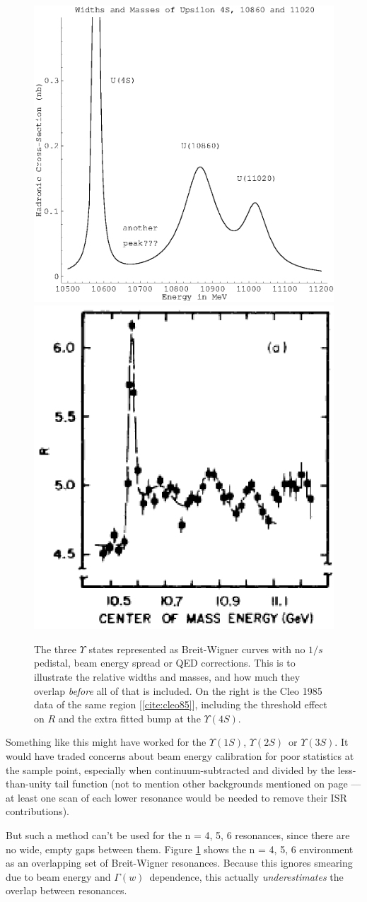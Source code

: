 \documentclass[12pt]{article}
\def\yis{$\Upsilon(1S)$}
\def\yiis{$\Upsilon(2S)$}
\def\yiiis{$\Upsilon(3S)$}
\def\yivs{$\Upsilon(4S)$}
\def\gamofw{$\Gamma(w)$}
\begin{document}
\begin{figure}[h]
  \begin{center}
    \includegraphics[width=0.35\linewidth]{theopeaks.eps}
    \includegraphics[width=0.35\linewidth]{exptpeaks.eps}
  \end{center}

  \caption{The three $\Upsilon$ states represented as Breit-Wigner
  curves with no $1/s$ pedistal, beam energy spread or QED
  corrections. This is to illustrate the relative widths and masses,
  and how much they overlap {\it before} all of that is included. On
  the right is the {\sc Cleo} 1985 data of the same region
  [\ref{cite:cleo85}], including the threshold effect on $R$ and the
  extra fitted bump at the \yivs.}

  \label{fig:theopeaks}
\end{figure}

Something like this might have worked for the \yis, \yiis\ or \yiiis.
It would have traded concerns about beam energy calibration for poor
statistics at the sample point, especially when continuum-subtracted
and divided by the less-than-unity tail function (not to mention other
backgrounds mentioned on page \pageref{page:other_backgrounds}--- at
least one scan of each lower resonance would be needed to remove their
ISR contributions).

But such a method can't be used for the n = 4, 5, 6 resonances, since
there are no wide, empty gaps between them. Figure \ref{fig:theopeaks}
shows the n = 4, 5, 6 environment as an overlapping set of
Breit-Wigner resonances. Because this ignores smearing due to beam
energy and \gamofw\ dependence, this actually {\it underestimates} the
overlap between resonances.
\end{document}
